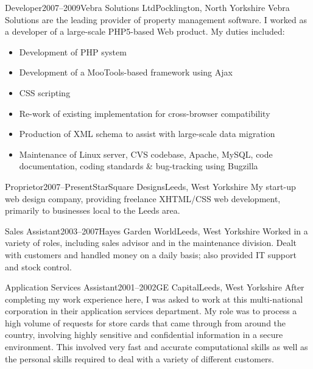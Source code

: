 \documentclass{cv}
\begin{document}
\begin{experience}{Developer}{2007--2009}{Vebra Solutions Ltd}{Pocklington, North Yorkshire}
Vebra Solutions are the leading provider of property management software. I worked as a developer of a large-scale PHP5-based Web product. My duties included:

\begin{itemize}
\item Development of PHP system
\item Development of a MooTools-based framework using Ajax
\item CSS scripting
\item Re-work of existing implementation for cross-browser compatibility
\item Production of XML schema to assist with large-scale data migration
\item Maintenance of Linux server, CVS codebase, Apache, MySQL, code documentation, coding standards \& bug-tracking using Bugzilla
\end{itemize}
\end{experience}

\begin{experience}{Proprietor}{2007--Present}{StarSquare Designs}{Leeds, West Yorkshire}
My start-up web design company, providing freelance XHTML/CSS web development, primarily to businesses local to the Leeds area.
\end{experience}

\begin{experience}{Sales Assistant}{2003--2007}{Hayes Garden World}{Leeds, West Yorkshire}
Worked in a variety of roles, including sales advisor and in the maintenance division. Dealt with customers and handled money on a daily basis; also provided IT support and stock control.
\end{experience}

\begin{experience}{Application Services Assistant}{2001--2002}{GE Capital}{Leeds, West Yorkshire}
After completing my work experience here, I was asked to work at this multi-national corporation in their application services department. My role was to process a high volume of requests for store cards that came through from around the country, involving highly sensitive and confidential information in a secure environment. This involved very fast and accurate computational skills as well as the personal skills required to deal with a variety of different customers.
\end{experience}
\end{document}
